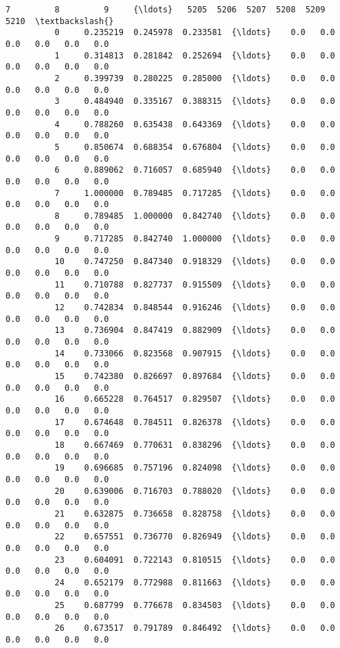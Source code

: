 \documentclass[11pt]{article}
\begin{document}
\begin{Verbatim}[commandchars=\\\{\}]
                    7         8         9     {\ldots}   5205  5206  5207  5208  5209  5210  \textbackslash{}
          0     0.235219  0.245978  0.233581  {\ldots}    0.0   0.0   0.0   0.0   0.0   0.0   
          1     0.314813  0.281842  0.252694  {\ldots}    0.0   0.0   0.0   0.0   0.0   0.0   
          2     0.399739  0.280225  0.285000  {\ldots}    0.0   0.0   0.0   0.0   0.0   0.0   
          3     0.484940  0.335167  0.388315  {\ldots}    0.0   0.0   0.0   0.0   0.0   0.0   
          4     0.788260  0.635438  0.643369  {\ldots}    0.0   0.0   0.0   0.0   0.0   0.0   
          5     0.850674  0.688354  0.676804  {\ldots}    0.0   0.0   0.0   0.0   0.0   0.0   
          6     0.889062  0.716057  0.685940  {\ldots}    0.0   0.0   0.0   0.0   0.0   0.0   
          7     1.000000  0.789485  0.717285  {\ldots}    0.0   0.0   0.0   0.0   0.0   0.0   
          8     0.789485  1.000000  0.842740  {\ldots}    0.0   0.0   0.0   0.0   0.0   0.0   
          9     0.717285  0.842740  1.000000  {\ldots}    0.0   0.0   0.0   0.0   0.0   0.0   
          10    0.747250  0.847340  0.918329  {\ldots}    0.0   0.0   0.0   0.0   0.0   0.0   
          11    0.710788  0.827737  0.915509  {\ldots}    0.0   0.0   0.0   0.0   0.0   0.0   
          12    0.742834  0.848544  0.916246  {\ldots}    0.0   0.0   0.0   0.0   0.0   0.0   
          13    0.736904  0.847419  0.882909  {\ldots}    0.0   0.0   0.0   0.0   0.0   0.0   
          14    0.733066  0.823568  0.907915  {\ldots}    0.0   0.0   0.0   0.0   0.0   0.0   
          15    0.742380  0.826697  0.897684  {\ldots}    0.0   0.0   0.0   0.0   0.0   0.0   
          16    0.665228  0.764517  0.829507  {\ldots}    0.0   0.0   0.0   0.0   0.0   0.0   
          17    0.674648  0.784511  0.826378  {\ldots}    0.0   0.0   0.0   0.0   0.0   0.0   
          18    0.667469  0.770631  0.838296  {\ldots}    0.0   0.0   0.0   0.0   0.0   0.0   
          19    0.696685  0.757196  0.824098  {\ldots}    0.0   0.0   0.0   0.0   0.0   0.0   
          20    0.639006  0.716703  0.788020  {\ldots}    0.0   0.0   0.0   0.0   0.0   0.0   
          21    0.632875  0.736658  0.828758  {\ldots}    0.0   0.0   0.0   0.0   0.0   0.0   
          22    0.657551  0.736770  0.826949  {\ldots}    0.0   0.0   0.0   0.0   0.0   0.0   
          23    0.604091  0.722143  0.810515  {\ldots}    0.0   0.0   0.0   0.0   0.0   0.0   
          24    0.652179  0.772988  0.811663  {\ldots}    0.0   0.0   0.0   0.0   0.0   0.0   
          25    0.687799  0.776678  0.834503  {\ldots}    0.0   0.0   0.0   0.0   0.0   0.0   
          26    0.673517  0.791789  0.846492  {\ldots}    0.0   0.0   0.0   0.0   0.0   0.0   

\end{Verbatim}
\end{document}
